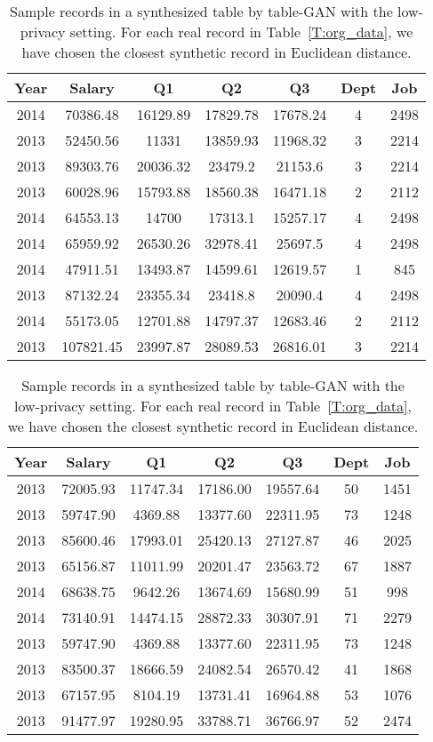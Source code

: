 \begin{table}[t]
\begin{tabular}{|c|c|c|c|c|c|c|}
       Year  & Salary  & Q1 & Q2 & Q3 & Dept & Job \\ \hline
        2014 & 70386.48  & 16129.89 & 17829.78 & 17678.24 &  4 & 2498 \\
  2013 & 52450.56  & 11331    & 13859.93 & 11968.32 &  3 & 2214\\
  2013 & 89303.76  & 20036.32 & 23479.2  & 21153.6  &  3& 2214\\
  2013 & 60028.96  & 15793.88 & 18560.38 & 16471.18 &  2 & 2112 \\
  2014 & 64553.13  & 14700    & 17313.1  & 15257.17 & 4 & 2498 \\
  2014 & 65959.92  & 26530.26 & 32978.41 & 25697.5  &  4 & 2498\\
  2014 & 47911.51  & 13493.87 & 14599.61 & 12619.57 &  1 & 845\\
  2013 & 87132.24  & 23355.34 & 23418.8  & 20090.4  &  4 & 2498\\
  2014 & 55173.05  & 12701.88 & 14797.37 & 12683.46 &  2 & 2112\\
  2013 & 107821.45 & 23997.87 & 28089.53 & 26816.01 &  3 & 2214\\
\hline
\end{tabular}
\vspace{1em}
\centering
\caption{Sample records in a synthesized table by table-GAN with the low-privacy setting. For each real record in Table~\ref{T:org_data}, we have chosen the closest synthetic record in Euclidean distance.\label{T:syn_data}}\vspace{-1em}
\begin{tabular}{|c|c|c|c|c|c|c|}
\hline
       Year  & Salary  & Q1 & Q2 & Q3 & Dept & Job \\ \hline 
2013& 72005.93  & 11747.34 & 17186.00 & 19557.64 & 50 & 1451 \\
2013 & 59747.90  & 4369.88  & 13377.60 & 22311.95 & 73 & 1248 \\
2013 & 85600.46  & 17993.01 & 25420.13 & 27127.87 & 46 & 2025 \\
2013 & 65156.87  & 11011.99 & 20201.47 & 23563.72 & 67 & 1887 \\
2014 & 68638.75  & 9642.26  & 13674.69 & 15680.99 & 51 & 998  \\
2014 & 73140.91  & 14474.15 & 28872.33 & 30307.91 & 71 & 2279 \\
2013 & 59747.90  & 4369.88  & 13377.60 & 22311.95 & 73 & 1248 \\
2013 & 83500.37  & 18666.59 & 24082.54 & 26570.42 & 41 & 1868 \\
2013 & 67157.95  & 8104.19  & 13731.41 & 16964.88 & 53 & 1076 \\
2013 & 91477.97  & 19280.95 & 33788.71 & 36766.97 & 52 & 2474\\
\hline
\end{tabular}


\end{table}
